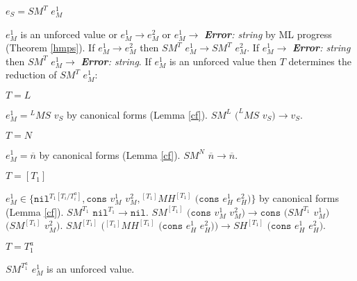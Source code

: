 \begin{case}

$e_{S}=SM^{T}$ $e_{M}^{1}$

$e_{M}^{1}$ is an unforced value or $e_{M}^{1}\rightarrow e_{M}^{2}$ or $e_{M}^{1}\rightarrow$ \emph{\textbf{Error}: string} by ML progress (Theorem \ref{hmps}).  If $e_{M}^{1}\rightarrow e_{M}^{2}$ then $SM^{T}$ $e_{M}^{1}\rightarrow SM^{T}$ $e_{M}^{2}$.  If $e_{M}^{1}\rightarrow$ \emph{\textbf{Error}: string} then $SM^{T}$ $e_{M}^{1}\rightarrow$ \emph{\textbf{Error}: string}.  If $e_{M}^{1}$ is an unforced value then $T$ determines the reduction of $SM^{T}$ $e_{M}^{1}$:

\begin{subcase}

$T=L$

$e_{M}^{1}={^{L}M}S$ $v_{S}$ by canonical forms (Lemma \ref{cf}).  $SM^{L}$ $(^{L}MS$ $v_{S})\rightarrow v_{S}$.

\end{subcase}

\begin{subcase}

$T=N$

$e_{M}^{1}=\overline{n}$ by canonical forms (Lemma \ref{cf}).  $SM^{N}$ $\overline{n}\rightarrow\overline{n}$.

\end{subcase}

\begin{subcase}

$T=[T_{1}]$

$e_{M}^{1}\in\lbrace\mathtt{nil}^{T_{1}[T_{i}/T_{i}^{a}]},\mathtt{cons}$ $v_{M}^{1}$ $v_{M}^{2},{^{[T_{1}]}M}H^{[T_{1}]}$ $(\mathtt{cons}$ $e_{H}^{1}$ $e_{H}^{2})\rbrace$ by canonical forms (Lemma \ref{cf}).  $SM^{T_{1}}$ $\mathtt{nil}^{T_{1}}\rightarrow\mathtt{nil}$.  $SM^{[T_{1}]}$ $(\mathtt{cons}$ $v_{M}^{1}$ $v_{M}^{2})\rightarrow\mathtt{cons}$ $(SM^{T_{1}}$ $v_{M}^{1})$ $(SM^{[T_{1}]}$ $v_{M}^{2})$.  $SM^{[T_{1}]}$ $({^{[T_{1}]}M}H^{[T_{1}]}$ $(\mathtt{cons}$ $e_{H}^{1}$ $e_{H}^{2}))\rightarrow SH^{[T_{1}]}$ $(\mathtt{cons}$ $e_{H}^{1}$ $e_{H}^{2})$.

\end{subcase}

\begin{subcase}

$T=T_{1}^{a}$

$SM^{T_{1}^{a}}$ $e_{M}^{1}$ is an unforced value.

\end{subcase}


\end{case}
